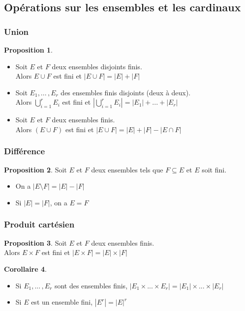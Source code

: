 \documentclass[10pt,a4paper]{article}
\theoremstyle{definition}
\newtheorem{proposition}{Proposition}[section]
\newtheorem{corollaire}[proposition]{Corollaire}
\begin{document}
\subsection{Opérations sur les ensembles et les cardinaux}
\subsubsection{Union}
\begin{proposition}
\hfill
\begin{itemize}
\item Soit $E$ et $F$ deux ensembles disjoints finis. \\
Alors $E \cup F$ est fini et $\left|E \cup F\right| = |E| + |F|$
\item Soit $E_1, ...\,, E_r$ des ensembles finis disjoints (deux à deux). \\
Alors $\bigcup\limits_{i = 1}^r E_i$ est fini et $\left| \bigcup\limits_{i = 1}^r E_i \right| = |E_1| + ... + |E_r|$
\item Soit $E$ et $F$ deux ensembles finis. \\
Alors $(E \cup F)$ est fini et $\left| E \cup F \right| = |E| + |F| - \left| E \cap F \right|$
\end{itemize}
\end{proposition}

\subsubsection{Différence}
\begin{proposition}
Soit $E$ et $F$ deux ensembles tels que $F \subseteq E$ et $E$ soit fini.
\begin{itemize}
\item On a $\left| E \setminus F \right| = |E| - |F|$
\item Si $|E| = |F|$, on a $E = F$
\end{itemize}
\end{proposition}

\subsubsection{Produit cartésien}
\begin{proposition}
Soit $E$ et $F$ deux ensembles finis. \\
Alors $E \times F$ est fini et $\left| E \times F \right| = |E| \times |F|$
\end{proposition}
\begin{corollaire}
\hfill \begin{itemize}
\item Si $E_1, ...\,, E_r$ sont des ensembles finis, $\left| E_1 \times ... \times E_r \right| = |E_1| \times ... \times |E_r|$
\item Si $E$ est un ensemble fini, $|E^r| = \left|E\right|^r$
\end{itemize}
\end{corollaire}
\end{document}
